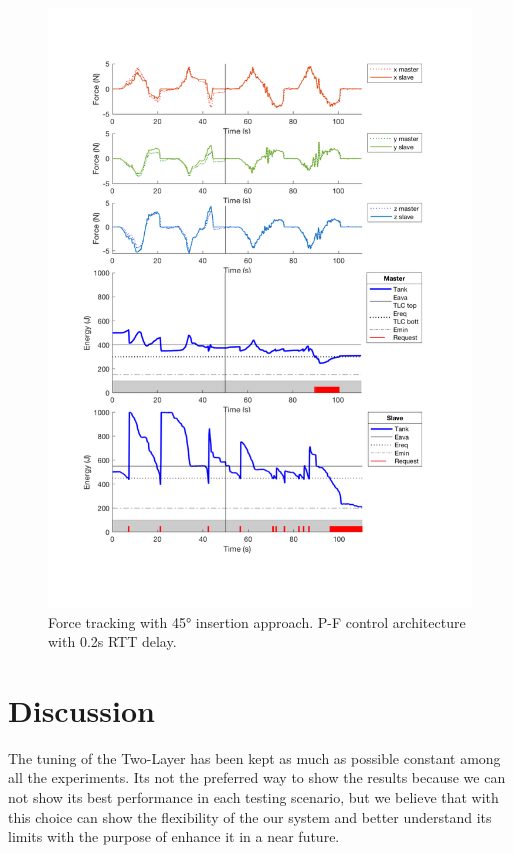 \begin{center}
	\begin{figure}
		\includegraphics[width=\textwidth, keepaspectratio]{plots/pf45Delay/Force.pdf}
		\caption{Force tracking with 45° insertion approach. P-F control architecture with 0.2s RTT delay.}
		\label{graph:pf45Delay/Force}
	\end{figure}
\end{center}
\newpage

\section{Discussion}
The tuning of the Two-Layer has been kept as much as possible constant among all the experiments. Its not the preferred way to show the results because we can not show its best performance in each testing scenario, but we believe that with this choice can show the flexibility of the our system and better understand its limits with the purpose of enhance it in a near future.

